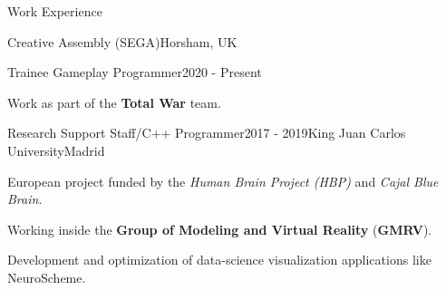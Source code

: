 \documentclass{resume} %
\begin{document}

\begin{mainSection}{Work Experience}



\begin{multiWorkExperience}
{Creative Assembly (SEGA)}{Horsham, UK}

\begin{multiWorkJob}
{Trainee Gameplay Programmer}{2020 - Present}

Work as part of the \textbf{Total War} team.
\end{multiWorkJob}

\end{multiWorkExperience}

\begin{singleWorkExperience}
{Research Support Staff/C++ Programmer}{2017 - 2019}{King Juan Carlos University}{Madrid}

European project funded by the \textit{Human Brain Project (HBP)} and \textit{Cajal Blue Brain}.

Working inside the {\textbf{Group of Modeling and Virtual Reality}} (\textbf{GMRV}).

Development and optimization of  data-science visualization applications like NeuroScheme.

\end{singleWorkExperience}

\end{mainSection}
\end{document}
